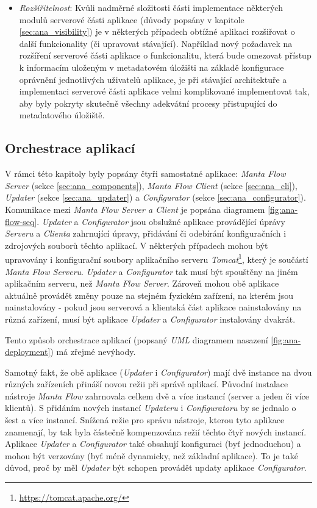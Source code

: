 \begin{itemize}
	\item{\textit{Rozšířitelnost}}: Kvůli nadměrné složitosti části implementace některých modulů serverové části aplikace (důvody popsány v kapitole \ref{sec:ana_visibility}) je v některých případech obtížné aplikaci rozšiřovat o další funkcionality (či upravovat stávající). Například nový požadavek na rozšíření serverové části aplikace o funkcionalitu, která bude omezovat přístup k informacím uloženým v metadatovém úložišti na základě konfigurace oprávnění jednotlivých uživatelů aplikace, je při stávající architektuře a implementaci serverové části aplikace velmi komplikované implementovat tak, aby byly pokryty skutečně všechny adekvátní procesy přistupující do metadatového úložiště.
\end{itemize}


\subsection{Orchestrace aplikací}
\label{sec:ana_orchestrace}
V rámci této kapitoly byly popsány čtyři samostatné aplikace: \textit{Manta Flow Server} (sekce \ref{sec:ana_components}), \textit{Manta Flow Client} (sekce \ref{sec:ana_cli}), \textit{Updater} (sekce \ref{sec:ana_updater}) a
\textit{Configurator} (sekce \ref{sec:ana_configurator}).
Komunikace mezi \textit{Manta Flow Server a Client} je popsána diagramem \ref{fig:ana-flow-seq}. \textit{Updater} a \textit{Configurator} jsou obslužné aplikace provádějící úprávy \textit{Serveru} a \textit{Clienta} zahrnující úpravy, přidávání či odebírání konfiguračních i zdrojových souborů těchto aplikací. V některých případech mohou být upravovány i konfigurační soubory aplikačního serveru \textit{Tomcat}\footnote{\url{https://tomcat.apache.org/}}, který je součástí \textit{Manta Flow Serveru}. \textit{Updater} a \textit{Configurator} tak musí být spouštěny na jiném aplikačním serveru, než \textit{Manta Flow Server}.
Zároveň mohou obě aplikace aktuálně provádět změny pouze na stejném fyzickém zařízení, na kterém jsou nainstalovány - pokud jsou serverová a klientská část aplikace nainstalovány na různá zařízení, musí být aplikace \textit{Updater} a \textit{Configurator} instalovány dvakrát.

Tento způsob orchestrace aplikací (popsaný \textit{UML} diagramem nasazení \ref{fig:ana-deployment}) má zřejmé nevýhody.

Samotný fakt, že obě aplikace (\textit{Updater} i \textit{Configurator}) mají dvě instance na dvou různých zařízeních přináší novou režii při správě aplikací. Původní instalace nástroje \textit{Manta Flow} zahrnovala celkem dvě a více instancí (server a jeden či více klientů). S přidáním nových instancí \textit{Updateru} i \textit{Configuratoru} by se jednalo o šest a více instancí. Snížená režie pro správu nástroje, kterou tyto aplikace znamenají, by tak byla částečně kompenzována režií těchto čtyř nových instancí. Aplikace \textit{Updater} a \textit{Configurator} také obsahují konfiguraci (byť jednoduchou) a mohou být verzovány (byť méně dynamicky, než základní aplikace). To je také důvod, proč by měl \textit{Updater} být schopen provádět updaty aplikace \textit{Configurator}.

